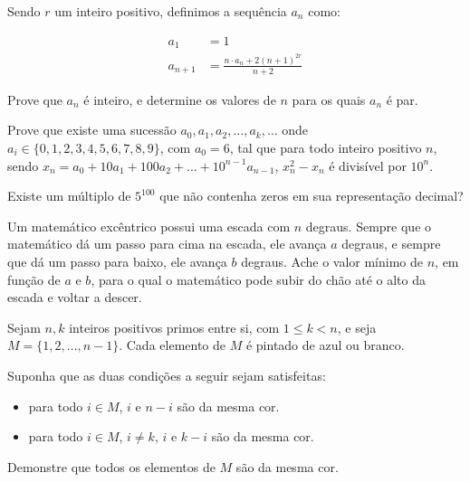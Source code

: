 \begin{questao}
  Sendo $r$ um inteiro positivo, definimos a sequência $a_n$ como:

  \begin{align*}
    a_1 & = 1 \\
    a_{n+1} & = \frac{n \cdot a_n+2(n+1)^{2r}}{n+2}
  \end{align*}

  Prove que $a_n$ é inteiro, e determine os valores de $n$ para os
  quais $a_n$ é par.
\end{questao}

\begin{questao}
  Prove que existe uma sucessão $a_0,a_1,a_2,\ldots,a_k,\ldots$ onde
  $a_i \in \{0,1,2,3,4,5,6,7,8,9\}$, com $a_0=6$, tal que para
  todo inteiro positivo $n$, sendo
  $x_n=a_0+10a_1+100a_2+\ldots+10^{n-1}a_{n-1}$, $x_n^2-x_n$ é
  divisível por $10^n$.
\end{questao}

\begin{questao}
  Existe um múltiplo de $5^{100}$ que não contenha zeros em sua
  representação decimal?
\end{questao}

\begin{questao}
  Um matemático excêntrico possui uma escada com $n$ degraus. Sempre
  que o matemático dá um passo para cima na escada, ele avança $a$
  degraus, e sempre que dá um passo para baixo, ele avança $b$
  degraus. Ache o valor mínimo de $n$, em função de $a$ e $b$,
  para o qual o matemático pode subir do chão até o alto da escada e
  voltar a descer.
\end{questao}

\begin{questao}
  Sejam $n,k$ inteiros positivos primos entre si, com $1 \leq k <
  n$, e seja $M = \{1,2,\ldots,n-1\}$. Cada elemento de $M$ é
  pintado de azul ou branco.

  Suponha que as duas condições a seguir sejam satisfeitas:
  \begin{itemize}

    \item para todo $i \in M$, $i$ e $n-i$ são da mesma cor.


    \item para todo $i \in M$, $i \not = k$, $i$ e $k-i$ são da
    mesma cor.
  \end{itemize}

  Demonstre que todos os elementos de $M$ são da mesma cor.
\end{questao}


